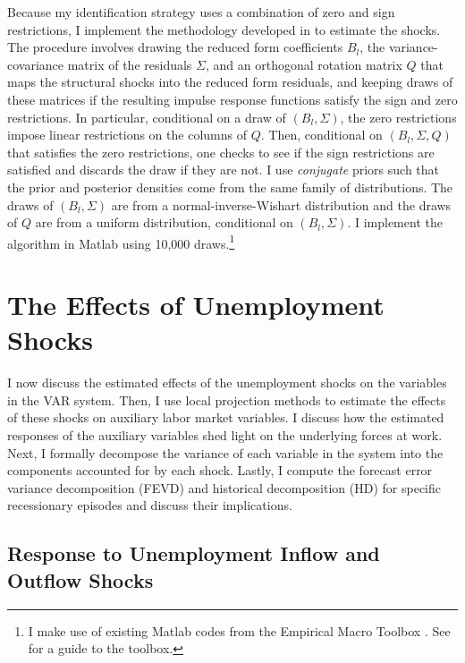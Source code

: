 \documentclass[12pt]{article}
\begin{document}
Because my identification strategy uses a combination of zero and sign restrictions, I implement the methodology developed in \cite{Arias:2018aa} to estimate the shocks. The procedure involves drawing the reduced form coefficients $B_l$, the variance-covariance matrix of the residuals $\Sigma$, and an orthogonal rotation matrix $Q$ that maps the structural shocks into the reduced form residuals, and keeping draws of these matrices if the resulting impulse response functions satisfy the sign and zero restrictions. In particular, conditional on a draw of $(B_l,\Sigma)$, the zero restrictions impose linear restrictions on the columns of $Q$. Then, conditional on $(B_l,\Sigma,Q)$ that satisfies the zero restrictions, one checks to see if the sign restrictions are satisfied and discards the draw if they are not. I use \textit{conjugate} priors such that the prior and posterior densities come from the same family of distributions. The draws of $(B_l, \Sigma)$ are from a normal-inverse-Wishart distribution and the draws of $Q$ are from a uniform distribution, conditional on $(B_l,\Sigma)$. I implement the algorithm in Matlab using 10,000 draws.\footnote{I make use of existing Matlab codes from the Empirical Macro Toolbox \citep{Ferroni:2025aa}. See \cite{Ferroni:2025ab} for a guide to the toolbox.} 

\section{The Effects of Unemployment Shocks}\label{sec:results}

I now discuss the estimated effects of the unemployment shocks on the variables in the VAR system. Then, I use local projection methods to estimate the effects of these shocks on auxiliary labor market variables. I discuss how the estimated responses of the auxiliary variables shed light on the underlying forces at work. Next, I formally decompose the variance of each variable in the system into the components accounted for by each shock. Lastly, I compute the forecast error variance decomposition (FEVD) and historical decomposition (HD) for specific recessionary episodes and discuss their implications.

\subsection{Response to Unemployment Inflow and Outflow Shocks}
\end{document}
